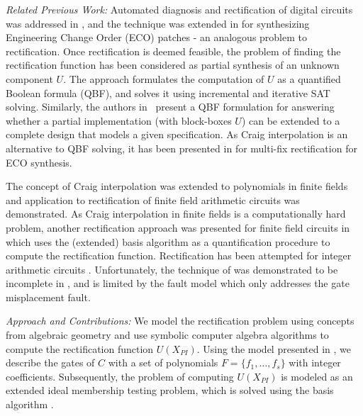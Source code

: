 \textit{Related Previous Work:} 
Automated diagnosis and rectification of digital circuits
was addressed in \cite{Madre:ICCAD89}, and the technique was extended
in \cite{Sadowska:DAC95} for synthesizing Engineering Change Order
(ECO) patches - an analogous problem to rectification. Once
rectification is deemed feasible, the problem of finding the 
rectification function has been considered as partial synthesis of an
unknown component $U$. The approach \cite{fujita:2015} formulates the
computation of $U$ as a quantified Boolean formula (QBF), and solves
it using incremental and iterative SAT solving. Similarly, the authors
in~\cite{scholl:2} present a QBF formulation for answering whether a
partial implementation (with block-boxes $U$) can be extended to a
complete design that models a given specification. As Craig
interpolation is an alternative to QBF solving, it has been presented
in \cite{Huang:DAC2011} for multi-fix rectification for ECO synthesis.  

The concept of Craig interpolation was extended to polynomials in
finite fields \cite{Utkarsh:vlsisoc18} \cite{utkarsh:ets19} and
application to rectification of finite field arithmetic circuits was
demonstrated. As Craig interpolation in finite fields is a
computationally hard problem, another rectification approach was
presented for finite field circuits in \cite{utkarsh:fmcad18} which
uses the (extended) \Grobner basis algorithm as a quantification
procedure to compute the rectification function. Rectification has
been attempted for integer arithmetic circuits \cite{farimah:2017:1}
\cite{Rolf:ISVLSI2018}. Unfortunately, the technique of
\cite{farimah:2017:1} was demonstrated to be incomplete in
\cite{utkarsh:fmcad18}, and \cite{Rolf:ISVLSI2018} is limited by the
fault model which only addresses the gate misplacement fault. 


\textit{Approach and Contributions:} We model the rectification problem
using concepts from algebraic geometry and use symbolic computer
algebra algorithms to compute the rectification function
$U(X_{PI})$. Using the model presented in
\cite{Armin2017ColumnWiseVO}, we describe the gates of $C$ with
a set of polynomials $F = \{f_1,\dots, f_s\}$ with integer
coefficients. Subsequently, the problem of computing $U(X_{PI})$ is
modeled as an extended ideal membership testing problem, which is
solved using the \Grobner basis algorithm \cite{gb_book}. 

